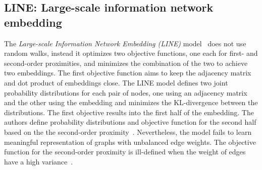 \subsection{LINE: Large-scale information network embedding}
\label{subsec:LINE}
The \emph{Large-scale Information Network Embedding (LINE)} model~ does not use random walks, instead it optimizes two objective functions, one each for first- and second-order proximities, and minimizes the combination of the two to achieve two embeddings. The first objective function aims to keep the adjacency matrix and dot product of embeddings close. The LINE model defines two joint probability distributions for each pair of nodes, one using an adjacency matrix and the other using the embedding and minimizes the KL-divergence between the distributions. The first objective results into the first half of the embedding. The authors define probability distributions and objective function for the second half based on the the second-order proximity~. Nevertheless, the model fails to learn meaningful representation of graphs with unbalanced edge weights. The objective function for the second-order proximity is ill-defined when the weight of edges have a high variance~.


